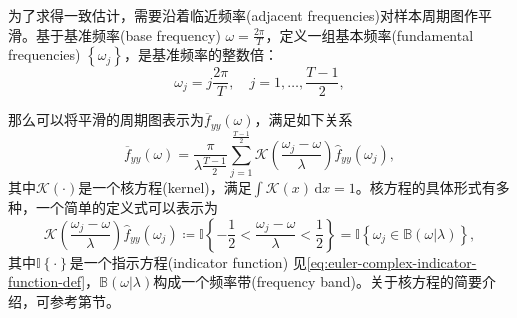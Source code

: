 为了求得一致估计，需要沿着临近频率(adjacent frequencies)对样本周期图作平滑。基于基准频率(base frequency) $\omega = \frac{2 \pi}{T}$，定义一组基本频率(fundamental frequencies) $\left\{ \omega_{j} \right\}$，是基准频率的整数倍：
\begin{equation*}
  \omega_{j} = j \frac{2 \pi}{T}, \quad j = 1, \ldots, \frac{T-1}{2},
\end{equation*}

那么可以将平滑的周期图表示为$\overline{f}_{yy} \left( \omega \right)$，满足如下关系
\begin{equation}
  \label{eq:spectral-periodgram-smooth}
  \overline{f}_{yy} \left( \omega \right)  =
  \frac{\pi}{ \lambda \frac{T-1}{2}} \sum_{j=1}^{\frac{T-1}{2}}
  \mathcal{K} \left( \frac{\omega_{j} - \omega}{\lambda} \right)
  \hat{f}_{yy} \left( \omega_{j} \right),
\end{equation}
其中$\mathcal{K}(\cdot)$是一个核方程(kernel)，满足$\int \mathcal{K}(x) \, \mathrm{d} x = 1$。核方程的具体形式有多种，一个简单的定义式可以表示为
\begin{equation}
  \label{eq:spectral-periodgram-smooth-kernel-def}
  \mathcal{K} \left( \frac{\omega_{j} - \omega}{\lambda} \right)
  \hat{f}_{yy} \left( \omega_{j} \right)
  \coloneqq \mathbb{I}
  \left\{
  - \frac{1}{2} < \frac{\omega_{j} - \omega }{\lambda} < \frac{1}{2}
  \right\}
  = \mathbb{I}
  \left\{
    \omega_{j} \in
    \mathbb{B} \left( \omega | \lambda \right)
  \right\},
\end{equation}
其中$\mathbb{I} \left\{ \cdot \right\}$是一个指示方程(indicator function)
见\eqref{eq:euler-complex-indicator-function-def}，$\mathbb{B} \left( \omega | \lambda \right)$构成一个频率带(frequency band)。关于核方程的简要介绍，可参考第节。
